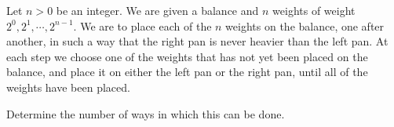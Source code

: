 Let $n > 0$ be an integer. We are given a balance and $n$ weights of weight $2^0, 2^1, \cdots, 2^{n-1}$. We are to place each of the $n$
 weights on the balance, one after another, in such a way that the right
 pan is never heavier than the left pan. At each step we choose one of 
the weights that has not yet been placed on the balance, and place it on
 either the left pan or the right pan, until all of the weights have 
been placed.

Determine the number of ways in which this can be done.
